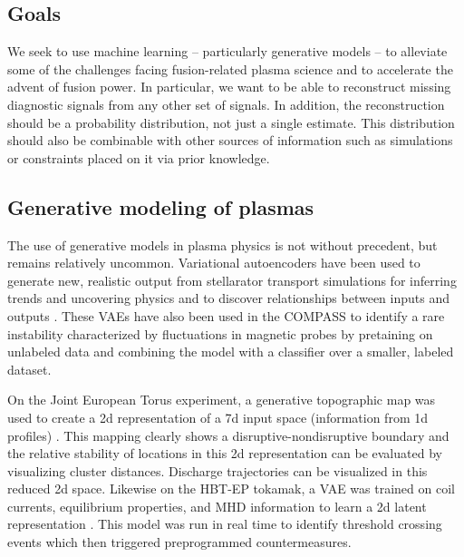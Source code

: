 \subsection{Goals}
We seek to use machine learning -- particularly generative models -- to alleviate some of the challenges facing fusion-related plasma science and to accelerate the advent of fusion power. In particular, we want to be able to reconstruct missing diagnostic signals from any other set of signals. In addition, the reconstruction should be a probability distribution, not just a single estimate. This distribution should also be combinable with other sources of information such as simulations or constraints placed on it via prior knowledge. 

\subsection{Generative modeling of plasmas}

The use of generative models in plasma physics is not without precedent, but remains relatively uncommon. Variational autoencoders \cite{kingma_auto-encoding_2022} have been used to generate new, realistic output from stellarator transport simulations for inferring trends and uncovering physics \cite{lennart_van_rijn_minimizing_2022} and to discover relationships between inputs and outputs \cite{vos_discovery_2024}. These VAEs have also been used in the COMPASS to identify a rare instability characterized by fluctuations in magnetic probes \cite{skvara_detection_2020} by pretaining on unlabeled data and combining the model with a classifier over a smaller, labeled dataset. 

On the Joint European Torus experiment, a generative topographic map was used to create a 2d representation of a 7d input space (information from 1d profiles) \cite{pau_machine_2019}. This mapping clearly shows a disruptive-nondisruptive boundary and the relative stability of locations in this 2d representation can be evaluated by visualizing cluster distances. Discharge trajectories can be visualized in this reduced 2d space. Likewise on the HBT-EP tokamak, a VAE was trained on coil currents, equilibrium properties, and MHD information to learn a 2d latent representation \cite{wei_dimensionality_2021}. This model was run in real time to identify threshold crossing events which then triggered preprogrammed countermeasures. 

